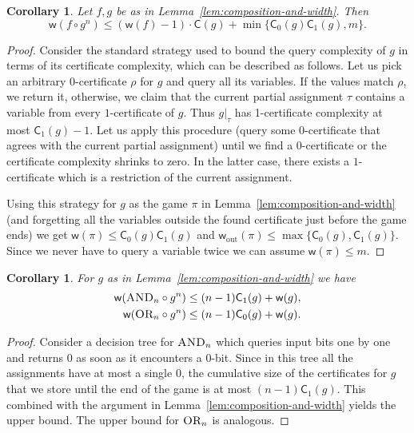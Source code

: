 \documentclass[11pt]{article}
\newcommand{\scterm}[1]{{\textrm{\sc #1}}}
\newcommand{\AND}{{\scterm{AND}}}
\newcommand{\OR}{{\scterm{OR}}}
\newcommand{\dagw}{\mathsf{w}}
\newcommand{\leafw}{\dagw_{\mathrm{out}}}
\newcommand{\cert}{\mathsf{C}}
\numberwithin{equation}{section}
\newtheorem{corollary}[theorem]{Corollary}
\begin{document}
\begin{corollary}
\label{cor:composition-and-width}
  Let $f,g$ be as in Lemma~\ref{lem:composition-and-width}. Then
  \[ \dagw(f \circ g^n) \le (\dagw(f) - 1) \cdot \cert(g) + \min\{\cert_0(g)\cert_1(g), m\}.\]
\end{corollary}
\begin{proof}
  Consider the standard strategy used to bound the query complexity of $g$ in terms of its certificate complexity, which can be described as follows. Let us pick an arbitrary $0$-certificate $\rho$ for $g$ and query all its variables. If the values match $\rho$, we return it, otherwise, we claim that the current partial assignment $\tau$ contains a variable from every $1$-certificate of $g$. Thus $g|_\tau$ has 1-certificate complexity at most $\cert_1(g) - 1$. Let us apply this procedure (query some $0$-certificate that agrees with the current partial assignment) until we find a $0$-certificate or the certificate complexity shrinks to zero. In the latter case, there exists a $1$-certificate which is a restriction of the current assignment.

  Using this strategy for $g$ as the game $\pi$ in Lemma~\ref{lem:composition-and-width} (and forgetting all the variables outside the found certificate just before the game ends) we get $\dagw(\pi) \le \cert_0(g) \cert_1(g)$ and $\leafw(\pi) \le \max\{\cert_0(g), \cert_1(g)\}$. Since we never have to query a variable twice we can assume $\dagw(\pi) \le m$.
\end{proof}

\begin{corollary}
  \label{cor:width-or}
    For $g$ as in Lemma~\ref{lem:composition-and-width} we have
    \begin{align*} 
    \dagw(\AND_n \circ g^n) \le (n-1)\cert_1(g) + \dagw(g), \\
    \dagw(\OR_n \circ g^n) \le (n-1)\cert_0(g) + \dagw(g).
      \end{align*}
\end{corollary}
\begin{proof}
    Consider a decision tree for $\AND_n$ which queries input bits one by one and returns $0$ as soon as it encounters a $0$-bit. Since in this tree all the assignments have at most a single $0$, the cumulative size of the certificates for $g$ that we store until the end of the game is at most $(n-1) \cert_1(g)$. This combined with the argument in Lemma~\ref{lem:composition-and-width} yields the upper bound. The upper bound for $\OR_n$ is analogous.
\end{proof}
\end{document}
